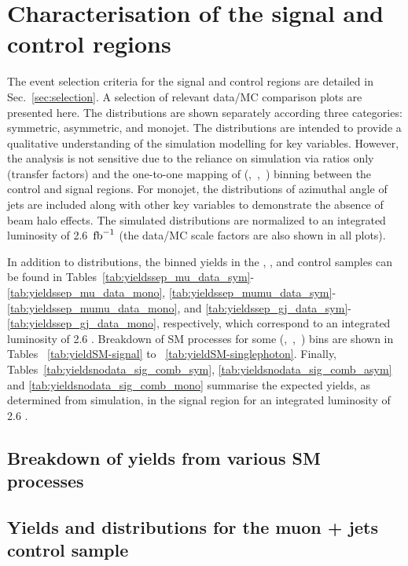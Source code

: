 \section{Characterisation of the signal and control regions}
\label{sec:yields}

The event selection criteria for the signal and control regions are
detailed in Sec.~\ref{sec:selection}. A selection of relevant data/MC
comparison plots are presented here. The distributions are shown
separately according three \njet categories: symmetric, asymmetric,
and monojet. The distributions are intended to provide a qualitative
understanding of the simulation modelling for key variables. However, 
the analysis is not sensitive due to the reliance on simulation via
ratios only (\ie transfer factors) and the one-to-one mapping of
(\njet,~\nb,~\scalht) binning between the control and signal
regions. For monojet, the distributions of azimuthal angle of jets are 
included along with other key variables to demonstrate the absence of 
beam halo effects. The simulated distributions are normalized to an integrated
luminosity of 2.6~$\text{fb}^{-1}$ (the data/MC scale factors are also shown
in all plots).

In addition to distributions, the binned yields in the \mj, \mmj, and
\gj control samples can be found in
Tables~\ref{tab:yieldssep_mu_data_sym}-\ref{tab:yieldssep_mu_data_mono},
\ref{tab:yieldssep_mumu_data_sym}-\ref{tab:yieldssep_mumu_data_mono},
and \ref{tab:yieldssep_gj_data_sym}-\ref{tab:yieldssep_gj_data_mono},
respectively, which correspond to an integrated luminosity of 2.6
\ifb. 
Breakdown of SM processes for some (\njet,~\nb,~\scalht) bins are shown in Tables
~\ref{tab:yieldSM-signal} to ~\ref{tab:yieldSM-singlephoton}.
Finally, Tables~\ref{tab:yieldsnodata_sig_comb_sym},
\ref{tab:yieldsnodata_sig_comb_asym} and \ref{tab:yieldsnodata_sig_comb_mono} summarise the expected yields, as
determined from simulation, in the signal region for an integrated
luminosity of 2.6 \ifb.

\clearpage
\subsection{Breakdown of yields from various SM processes}





\clearpage
\subsection{Yields and distributions for the muon + jets control sample}

